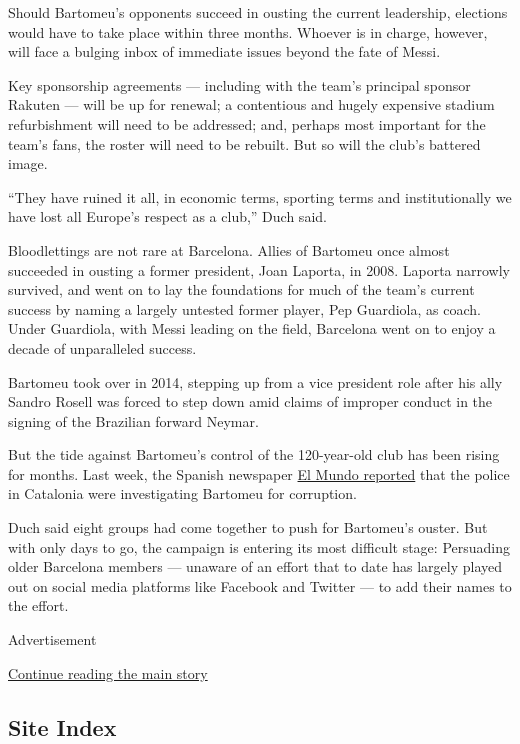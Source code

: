 Should Bartomeu's opponents succeed in ousting the current leadership,
elections would have to take place within three months. Whoever is in
charge, however, will face a bulging inbox of immediate issues beyond
the fate of Messi.

Key sponsorship agreements --- including with the team's principal
sponsor Rakuten --- will be up for renewal; a contentious and hugely
expensive stadium refurbishment will need to be addressed; and, perhaps
most important for the team's fans, the roster will need to be rebuilt.
But so will the club's battered image.

``They have ruined it all, in economic terms, sporting terms and
institutionally we have lost all Europe's respect as a club,'' Duch
said.

Bloodlettings are not rare at Barcelona. Allies of Bartomeu once almost
succeeded in ousting a former president, Joan Laporta, in 2008. Laporta
narrowly survived, and went on to lay the foundations for much of the
team's current success by naming a largely untested former player, Pep
Guardiola, as coach. Under Guardiola, with Messi leading on the field,
Barcelona went on to enjoy a decade of unparalleled success.

Bartomeu took over in 2014, stepping up from a vice president role after
his ally Sandro Rosell was forced to step down amid claims of improper
conduct in the signing of the Brazilian forward Neymar.

But the tide against Bartomeu's control of the 120-year-old club has
been rising for months. Last week, the Spanish newspaper
\href{https://www.elmundo.es/deportes/futbol/primera-division/2020/09/03/5f51354efc6c8361398b46a9.html}{El
Mundo reported} that the police in Catalonia were investigating Bartomeu
for corruption.

Duch said eight groups had come together to push for Bartomeu's ouster.
But with only days to go, the campaign is entering its most difficult
stage: Persuading older Barcelona members --- unaware of an effort that
to date has largely played out on social media platforms like Facebook
and Twitter --- to add their names to the effort.

Advertisement

\protect\hyperlink{after-bottom}{Continue reading the main story}

\hypertarget{site-index}{%
\subsection{Site Index}\label{site-index}}

